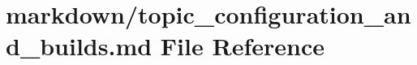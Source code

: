 \hypertarget{topic__configuration__and__builds_8md}{}\section{markdown/topic\+\_\+configuration\+\_\+and\+\_\+builds.md File Reference}
\label{topic__configuration__and__builds_8md}
